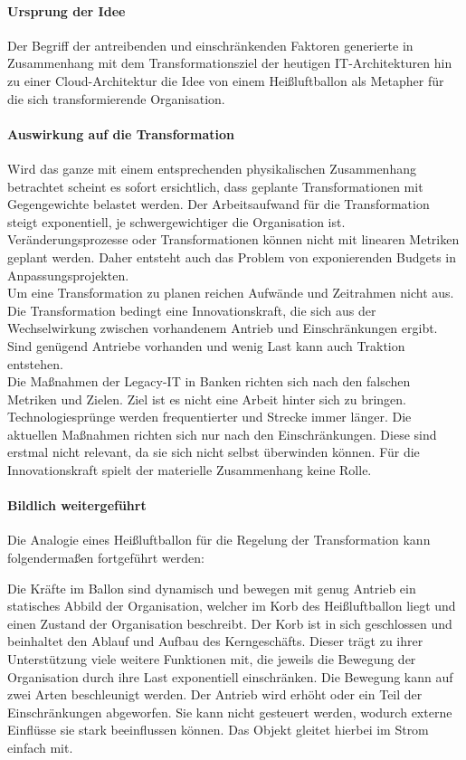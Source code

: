 \paragraph{Ursprung der Idee}
Der Begriff der antreibenden und einschränkenden Faktoren generierte in Zusammenhang mit dem Transformationsziel der heutigen IT-Architekturen hin zu einer Cloud-Architektur die Idee von einem Heißluftballon als Metapher für die sich transformierende Organisation.

\paragraph{Auswirkung auf die Transformation}

Wird das ganze mit einem entsprechenden physikalischen Zusammenhang betrachtet scheint es sofort ersichtlich, dass geplante Transformationen mit Gegengewichte belastet werden. Der Arbeitsaufwand für die Transformation steigt exponentiell, je schwergewichtiger die Organisation ist. Veränderungsprozesse oder Transformationen können nicht mit linearen Metriken geplant werden. Daher entsteht auch das Problem von exponierenden Budgets in Anpassungsprojekten.
\medskip
\\
Um eine Transformation zu planen reichen Aufwände und Zeitrahmen nicht aus. Die Transformation bedingt eine Innovationskraft, die sich aus der Wechselwirkung zwischen vorhandenem Antrieb und Einschränkungen ergibt. Sind genügend Antriebe vorhanden und wenig Last kann auch Traktion entstehen.
\medskip
\\
Die Maßnahmen der Legacy-IT in Banken richten sich nach den falschen Metriken und Zielen. Ziel ist es nicht eine Arbeit hinter sich zu bringen. Technologiesprünge werden frequentierter und Strecke immer länger.
Die aktuellen Maßnahmen richten sich nur nach den Einschränkungen. Diese sind erstmal nicht relevant, da sie sich nicht selbst überwinden können. Für die Innovationskraft spielt der materielle Zusammenhang keine Rolle.

\paragraph{Bildlich weitergeführt}
Die Analogie eines Heißluftballon für die Regelung der Transformation kann folgendermaßen fortgeführt werden:

Die Kräfte im Ballon sind dynamisch und bewegen mit genug Antrieb ein statisches Abbild der Organisation, welcher im Korb des Heißluftballon liegt und einen Zustand der Organisation beschreibt. Der Korb ist in sich geschlossen und beinhaltet den Ablauf und Aufbau des Kerngeschäfts. Dieser trägt zu ihrer Unterstützung viele weitere Funktionen mit, die jeweils die Bewegung der Organisation durch ihre Last exponentiell einschränken. Die Bewegung kann auf zwei Arten beschleunigt werden. Der Antrieb wird erhöht oder ein Teil der Einschränkungen abgeworfen. Sie kann nicht gesteuert werden, wodurch externe Einflüsse sie stark beeinflussen können. Das Objekt gleitet hierbei im Strom einfach mit.
\medskip
\\

